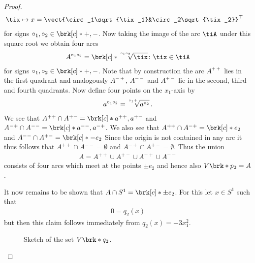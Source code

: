 \begin{proof}
\begin{align}
    \tix&\mapsto x=\vect{\circ_1\sqrt{\tix_1}&\circ_2\sqrt{\tix_2}}^\top
  \end{align}
  for signs $\circ_1,\circ_2\in\brk[c]*{+,-}$.
  Now taking the image of the arc $\tiA$ under this square root we obtain four arcs
  \begin{align*}
    A^{\circ_1\circ_2}=\brk[c]*{\sqrt[\leftroot{2}\uproot{4}\circ_1\circ_2]{\tix}\colon\tix\in \tiA}
  \end{align*}
  for signs $\circ_1,\circ_2\in\brk[c]*{+,-}$.
  Note that by construction the arc $A^{++}$ lies in the first quadrant and analogously
  $A^{-+}$, $A^{--}$ and $A^{+-}$ lie in the second, third and fourth quadrants.
  Now define four points on the $x_1$-axis by
  \begin{align}
    a^{\circ_1\circ_2}=\sqrt[\leftroot{2}\uproot{4}\circ_1+]{a^{\circ_2}}\,.
  \end{align}
  We see that $A^{++}\cap A^{+-}=\brk[c]*{a^{++},a^{+-}}$ and
  $A^{-+}\cap A^{--}=\brk[c]*{a^{--},a^{-+}}$.
  We also see that $A^{++}\cap A^{-+}=\brk[c]*{e_2}$ and 
  $A^{--}\cap A^{+-}=\brk[c]*{-e_2}$
  Since the origin is not contained in any arc it thus follows that $A^{++}\cap A^{--}=\emptyset$ 
  and $A^{-+}\cap A^{+-}=\emptyset$.
  Thus the union
  \begin{align}
    A=A^{++}\cup A^{+-}\cup A^{-+}\cup A^{--}
  \end{align}
  consists of four arcs which meet at the points $\pm e_2$ and hence also
  $V\brk*{p_2}=A$.

  It now remains to be shown that $A\cap S^1=\brk[c]*{\pm e_2}$.
  For this let $x\in S^1$ such that
  \begin{align}
    0=q_2(x)
  \end{align}
  but then this claim follows immediately from $q_2(x)=-3x_1^2$.

  \begin{figure}
    \centering
    
    \caption{Sketch of the set $V\brk*{q_2}$.}
    \label{fi:n3_polynomial_projectionComponentConics}
  \end{figure}
  


\end{proof}
